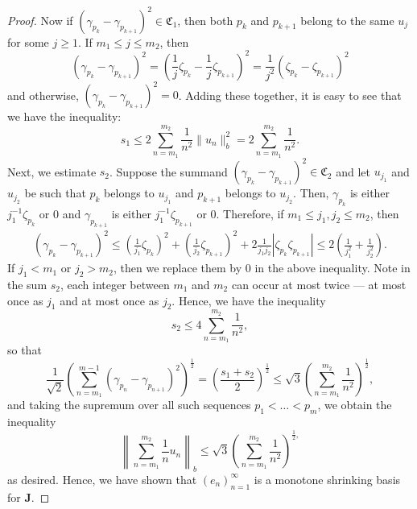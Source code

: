 \documentclass[11pt]{article}
\theoremstyle{thmstyle}
\theoremstyle{defstyle}
\renewcommand{\le}{\leqslant}
\renewcommand{\ge}{\geqslant}
\newcommand{\bfJ}{\mathbf{J}}
\begin{document}
\begin{proof}
	Now if $(\gamma_{p_k} - \gamma_{p_{k + 1}})^2\in\mathfrak{C}_1$, then both $p_k$ and $p_{k + 1}$ belong to the same $u_j$ for some $j\ge 1$. If $m_1\le j\le m_2$, then 
	\begin{equation*}
		\left(\gamma_{p_k} - \gamma_{p_{k + 1}}\right)^2 = \left(\frac{1}{j}\zeta_{p_k} - \frac{1}{j}\zeta_{p_{k + 1}}\right)^2 = \frac{1}{j^2}\left(\zeta_{p_k} - \zeta_{p_{k + 1}}\right)^2
	\end{equation*}
	and otherwise, $\left(\gamma_{p_k} - \gamma_{p_{k + 1}}\right)^2 = 0$. Adding these together, it is easy to see that we have the inequality: 
	\begin{equation*}
		s_1\le 2\sum_{n = m_1}^{m_2}\frac{1}{n^2}\|u_n\|_b^2 = 2\sum_{n = m_1}^{m_2}\frac{1}{n^2}.
	\end{equation*}
	Next, we estimate $s_2$. Suppose the summand $(\gamma_{p_k} - \gamma_{p_{k + 1}})^2\in\mathfrak{C}_2$ and let $u_{j_1}$ and $u_{j_2}$ be such that $p_k$ belongs to $u_{j_1}$ and $p_{k + 1}$ belongs to $u_{j_2}$. Then, $\gamma_{p_k}$ is either $j_1^{-1}\zeta_{p_k}$ or $0$ and $\gamma_{p_{k + 1}}$ is either $j_1^{-1}\zeta_{p_{k + 1}}$ or $0$. Therefore, if $m_1\le j_1, j_2\le m_2$, then 
	\begin{align*}
		\left(\gamma_{p_k} - \gamma_{p_{k + 1}}\right)^2\le \left(\frac{1}{j_1}\zeta_{p_k}\right)^2 + \left(\frac{1}{j_2}\zeta_{p_{k + 1}}\right)^2 + 2\frac{1}{j_1j_2}|\zeta_{p_{k}}\zeta_{p_{k + 1}}|\le 2\left(\frac{1}{j_1^2} + \frac{1}{j_2^2}\right).
	\end{align*}
	If $j_1 < m_1$ or $j_2 > m_2$, then we replace them by $0$ in the above inequality. Note in the sum $s_2$, each integer between $m_1$ and $m_2$ can occur at most twice --- at most once as $j_1$ and at most once as $j_2$. Hence, we have the inequality 
	\begin{equation*}
		s_2\le 4\sum_{n = m_1}^{m_2}\frac{1}{n^2},
	\end{equation*}
	so that 
	\begin{equation*}
		\frac{1}{\sqrt 2}\left(\sum_{n = m_1}^{m - 1}(\gamma_{p_n} - \gamma_{p_{n + 1}})^2\right)^{\frac{1}{2}} = \left(\frac{s_1 + s_2}{2}\right)^{\frac{1}{2}}\le \sqrt 3\left(\sum_{n = m_1}^{m_2}\frac{1}{n^2}\right)^{\frac{1}{2}},
	\end{equation*}
	and taking the supremum over all such sequences $p_1 < \dots < p_m$, we obtain the inequality 
	\begin{equation*}
		\left\|\sum_{n = m_1}^{m_2}\frac{1}{n}u_n\right\|_b\le \sqrt{3}\left(\sum_{n = m_1}^{m_2}\frac{1}{n^2}\right)^{\frac{1}{2},}
	\end{equation*}
	as desired. Hence, we have shown that $(e_n)_{n =1 }^\infty$ is a monotone shrinking basis for $\bfJ$.
\end{proof}
\end{document}
